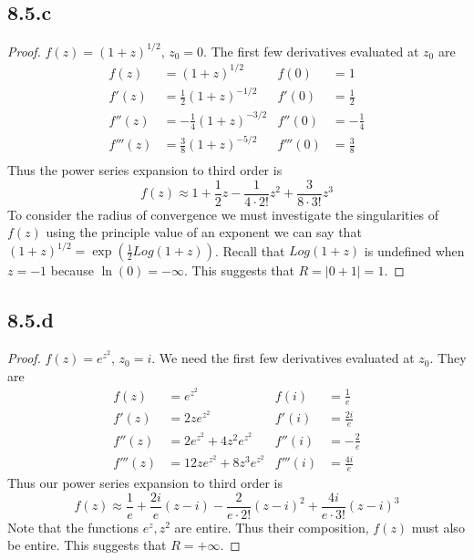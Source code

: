 \documentclass[a4paper, 11pt]{article}
\begin{document}
\subsection*{8.5.c} 
	\begin{proof}
		$f(z) = (1+z)^{1/2}$, $z_0 = 0$. The first few derivatives evaluated at $z_0$ are 
			\begin{align*}
				f(z) &= (1+z)^{1/2} & f(0)&= 1 \\ 
				f'(z) &= \frac{1}{2}(1+z)^{-1/2} & f'(0)&=\frac{1}{2} \\ 
				f''(z) &= -\frac{1}{4}(1+z)^{-3/2} & f''(0)&= -\frac{1}{4} \\ 
				f'''(z) &= \frac{3}{8}(1+z)^{-5/2} & f'''(0)&= \frac{3}{8} \\ 
			\end{align*}
		Thus the power series expansion to third order is 
			\begin{equation*}
				f(z) \approx 1 + \frac{1}{2}z -\frac{1}{4\cdot 2!}z^2+\frac{3}{8\cdot 3!}z^3
			\end{equation*}
		To consider the radius of convergence we must investigate the singularities of $f(z)$ using the principle value of an exponent we can say that $(1+z)^{1/2} = \exp(\frac{1}{2}Log(1+z))$. Recall that $Log(1+z)$ is undefined when $z=-1$ because $\ln(0) = -\infty$. This suggests that $R = |0+1| = 1$. 
	\end{proof}
	
\subsection*{8.5.d}
	\begin{proof}
		$f(z)=e^{z^2}$, $z_0 = i$. We need the first few derivatives evaluated at $z_0$. They are
			\begin{align*}
				f(z) &= e^{z^2} & f(i) &= \frac{1}{e} \\ 
				f'(z) &= 2ze^{z^2} & f'(i) &= \frac{2i}{e} \\ 
				f''(z) &= 2e^{z^2}+4z^2e^{z^2} & f''(i) &= -\frac{2}{e} \\ 
				f'''(z) &= 12ze^{z^2} + 8z^3e^{z^2} & f'''(i)&= \frac{4i}{e}
			\end{align*}
		Thus our power series expansion to third order is 
			\begin{equation*}
				f(z) \approx \frac{1}{e} + \frac{2 i}{e}(z-i) -\frac{2}{e\cdot 2!}(z-i)^2+\frac{4i}{e\cdot 3!}(z-i)^3 
			\end{equation*}
		Note that the functions $e^z, z^2$ are entire. Thus their composition, $f(z)$ must also be entire. This suggests that $R=+\infty$. 
	\end{proof}
	
\end{document}
